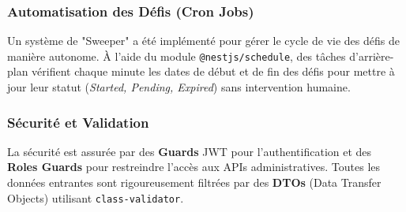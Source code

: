 \subsubsection{Automatisation des Défis (Cron Jobs)}
Un système de "Sweeper" a été implémenté pour gérer le cycle de vie des défis de manière autonome. À l'aide du module \texttt{@nestjs/schedule}, des tâches d'arrière-plan vérifient chaque minute les dates de début et de fin des défis pour mettre à jour leur statut (\textit{Started, Pending, Expired}) sans intervention humaine.

\subsubsection{Sécurité et Validation}
La sécurité est assurée par des \textbf{Guards} JWT pour l'authentification et des \textbf{Roles Guards} pour restreindre l'accès aux APIs administratives. Toutes les données entrantes sont rigoureusement filtrées par des \textbf{DTOs} (Data Transfer Objects) utilisant \texttt{class-validator}.
